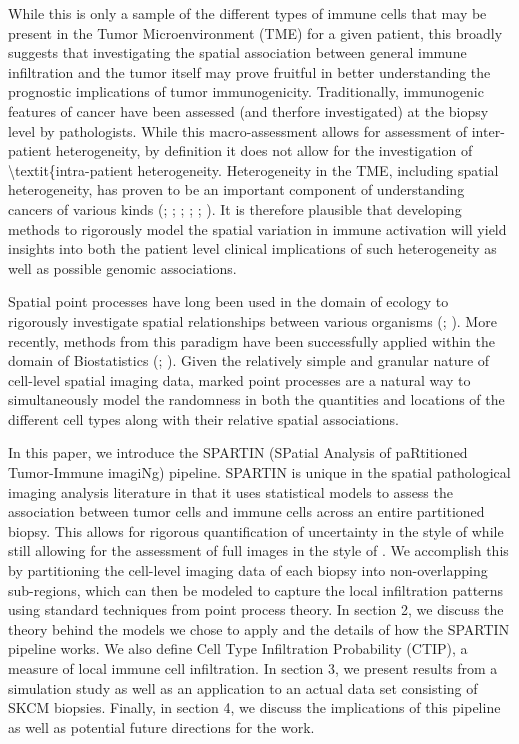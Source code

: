 \documentclass[
]{book}
\begin{document}
While this is only a sample of the different types of immune cells that may be present in the Tumor Microenvironment (TME) for a given patient, this broadly suggests that investigating the spatial association between general immune infiltration and the tumor itself may prove fruitful in better understanding the prognostic implications of tumor immunogenicity. Traditionally, immunogenic features of cancer have been assessed (and therfore investigated) at the biopsy level by pathologists. While this macro-assessment allows for assessment of inter-patient heterogeneity, by definition it does not allow for the investigation of \textbackslash textit\{intra-patient heterogeneity. Heterogeneity in the TME, including spatial heterogeneity, has proven to be an important component of understanding cancers of various kinds (\citet{Heindl15}; \citet{Yuan16}; \citet{Bareche20}; \citet{Boxberg19}; \citet{Yan19}; \citet{Hunter21}). It is therefore plausible that developing methods to rigorously model the spatial variation in immune activation will yield insights into both the patient level clinical implications of such heterogeneity as well as possible genomic associations.

Spatial point processes have long been used in the domain of
ecology to rigorously investigate spatial relationships between
various organisms (\citet{Hogsar99}; \citet{King12}). More
recently, methods from this paradigm have been successfully
applied within the domain of Biostatistics (\citet{Kang11};
\citet{Ray15}). Given the relatively simple and granular nature
of cell-level spatial imaging data, marked point processes are a
natural way to simultaneously model the randomness in both the
quantities and locations of the different cell types along with
their relative spatial associations.

In this paper, we introduce the SPARTIN (SPatial Analysis of
paRtitioned Tumor-Immune imagiNg) pipeline. SPARTIN is unique
in the spatial pathological imaging analysis literature in that it
uses statistical models to assess the association between tumor
cells and immune cells across an entire partitioned biopsy. This
allows for rigorous quantification of uncertainty in the style of
\citet{LiMIM19} while still allowing for the assessment of full
images in the style of \citet{Saltz18}. We accomplish this by
partitioning the cell-level imaging data of each biopsy into
non-overlapping sub-regions, which can then be modeled to capture
the local infiltration patterns using standard techniques from
point process theory.
In section 2, we discuss the theory behind
the models we chose to apply and the details of how the SPARTIN
pipeline works. We also define Cell Type Infiltration Probability (CTIP), a measure of local immune cell infiltration. In section 3, we present results from a simulation
study as well as an application to an actual data set consisting of
SKCM biopsies.
Finally, in section 4, we discuss the implications
of this pipeline as well as potential future directions for the
work.
\end{document}
